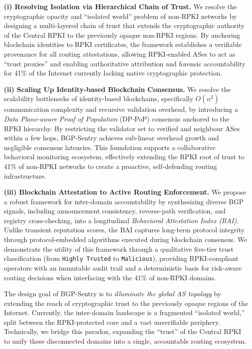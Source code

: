 \documentclass[conference]{IEEEtran}
\newcommand{\rj}[1]{{\color{blue}#1}}
\begin{document}
\noindent \textbf{(i) Resolving Isolation via Hierarchical Chain of Trust.} 
\rj{We resolve the cryptographic opacity and ``isolated world'' problem of non-RPKI networks by designing a multi-layered chain of trust that extends the cryptographic authority of the Central RPKI to the previously opaque non-RPKI regions. By anchoring blockchain identities to RPKI certificates, the framework establishes a verifiable provenance for all routing attestations, allowing RPKI-enabled ASes to act as ``trust proxies'' and enabling authoritative attribution and forensic accountability for 41\% of the Internet currently lacking native cryptographic protection.}

\noindent \textbf{(ii) Scaling Up Identity-based Blockchain Consensus.} 
\rj{We resolve the scalability bottlenecks of identity-based blockchains, specifically $O(n^2)$ communication complexity and recursive validation overhead, by introducing a \textit{Data Plane-aware Proof of Population} (DP-PoP) consensus anchored to the RPKI hierarchy. By restricting the validator set to verified and neighbour ASes within a few hops, BGP-Sentry achieves sub-linear overhead growth and negligible consensus latencies. This foundation supports a collaborative behavioral monitoring ecosystem, effectively extending the RPKI root of trust to 41\% of non-RPKI networks to create a proactive, self-defending routing infrastructure.}

\noindent \textbf{(iii) Blockchain Attestation to Active Routing Enforcement.} 
\rj{We propose a robust framework for inter-domain accountability by synthesizing diverse BGP signals, including announcement consistency, reverse-path verification, and registry cross-checking, into a longitudinal \textit{Behavioral Attestation Index (BAI)}. Unlike transient reputation scores, the BAI captures long-term protocol integrity through protocol-embedded algorithms executed during blockchain consensus. We demonstrate the utility of this framework through a qualitative five-tier trust classification (from \texttt{Highly Trusted} to \texttt{Malicious}), providing RPKI-compliant operators with an immutable audit trail and a deterministic basis for risk-aware routing decisions when interfacing with the 41\% of non-RPKI domains.}

\rj{The design goal of BGP-Sentry is to \textit{illuminate the global AS topology} by extending the reach of cryptographic trust to the previously opaque regions of the Internet. Currently, the inter-domain landscape is a fragmented ``isolated world,'' split between the RPKI-protected core and a vast unverifiable periphery. Technically, we bridge this paradox, expanding the ``trust'' of the Central RPKI to unify these disconnected domains into a single, accountable routing ecosystem.}
\end{document}
